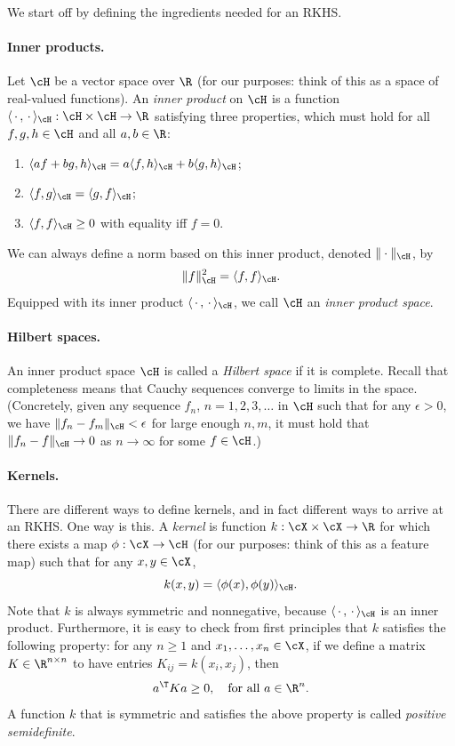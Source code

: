 \documentclass{article}
\begin{document}
We start off by defining the ingredients needed for an RKHS. 

\paragraph{Inner products.}

Let $\cH$ be a vector space over $\R$ (for our purposes: think of this as a
space of real-valued functions). An \emph{inner product} on $\cH$ is a function
$\langle \,\cdot\,, \,\cdot\, \rangle_\cH : \cH \times \cH \to \R$ satisfying
three properties, which must hold for all $f,g,h \in \cH$ and all $a,b \in \R$: 
\begin{enumerate}
\item $\langle af + bg, h \rangle_\cH = a \langle f,h \rangle_\cH + b \langle
  g,h \rangle_\cH$;
\item $\langle f,g \rangle_\cH = \langle g,f \rangle_\cH$;
\item $\langle f,f \rangle_\cH \geq 0$ with equality iff $f=0$. 
\end{enumerate}
We can always define a norm based on this inner product, denoted
$\|\cdot\|_\cH$, by 
\[
\|f\|_\cH^2 = \langle f, f \rangle_\cH.
\]
Equipped with its inner product $\langle \,\cdot\,, \,\cdot\, \rangle_\cH$, we
call $\cH$ an \emph{inner product space}. 

\paragraph{Hilbert spaces.} 

An inner product space $\cH$ is called a \emph{Hilbert space} if it is
complete. Recall that completeness means that Cauchy sequences converge to   
limits in the space. (Concretely, given any sequence $f_n$, $n=1,2,3,\dots$ in
$\cH$ such that for any $\epsilon>0$, we have $\|f_n - f_m\|_\cH < \epsilon$ for
large enough $n,m$, it must hold that $\|f_n - f\|_\cH \to 0$ as $n \to \infty$
for some $f \in \cH$.)

\paragraph{Kernels.}

There are different ways to define kernels, and in fact different ways to arrive 
at an RKHS. One way is this. A \emph{kernel} is function $k : \cX \times \cX \to 
\R$ for which there exists a map $\phi : \cX \to \cH$ (for our purposes: think
of this as a feature map) such that for any $x,y \in \cX$,  
\[
k(x,y) = \langle \phi(x), \phi(y) \rangle_\cH.
\]
Note that $k$ is always symmetric and nonnegative, because $\langle \,\cdot\,, 
\,\cdot\, \rangle_\cH$ is an inner product. Furthermore, it is easy to check
from first principles that $k$ satisfies the following property: for any $n \geq
1$ and $x_1,\dots,x_n \in \cX$, if we define a matrix $K \in \R^{n \times n}$ to 
have entries $K_{ij} = k(x_i, x_j)$, then  
\[
a^\T K a \geq 0, \quad \text{for all $a \in \R^n$}.
\]
A function $k$ that is symmetric and satisfies the above property is called 
\emph{positive semidefinite}. 
\end{document}
